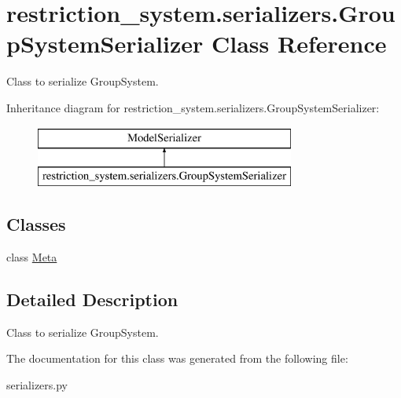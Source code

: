 \hypertarget{classrestriction__system_1_1serializers_1_1GroupSystemSerializer}{}\section{restriction\+\_\+system.\+serializers.\+Group\+System\+Serializer Class Reference}
\label{classrestriction__system_1_1serializers_1_1GroupSystemSerializer}


Class to serialize Group\+System.  


Inheritance diagram for restriction\+\_\+system.\+serializers.\+Group\+System\+Serializer\+:\begin{figure}[H]
\begin{center}
\leavevmode
\includegraphics[height=2.000000cm]{classrestriction__system_1_1serializers_1_1GroupSystemSerializer}
\end{center}
\end{figure}
\subsection*{Classes}
\begin{DoxyCompactItemize}
\item 
class \hyperlink{classrestriction__system_1_1serializers_1_1GroupSystemSerializer_1_1Meta}{Meta}
\end{DoxyCompactItemize}


\subsection{Detailed Description}
Class to serialize Group\+System. 

The documentation for this class was generated from the following file\+:\begin{DoxyCompactItemize}
\item 
serializers.\+py\end{DoxyCompactItemize}

